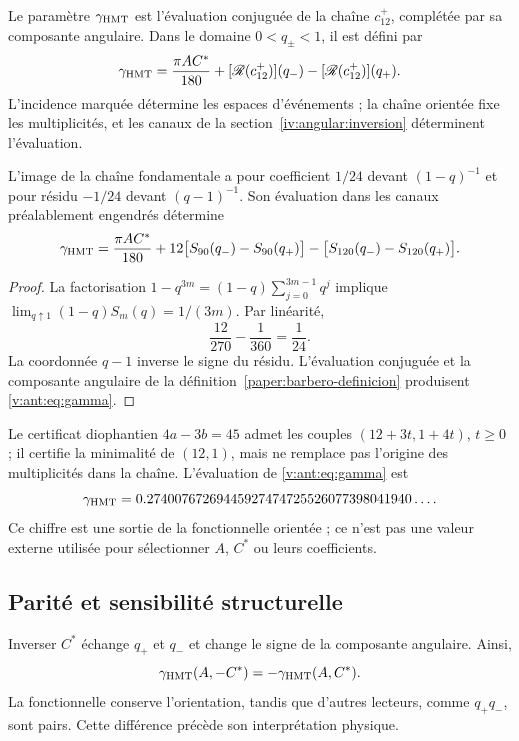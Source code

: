 \begin{definition}
\label{paper:barbero-definicion}
Le paramètre \(\gamma_{\mathrm{HMT}}\) est l’évaluation conjuguée de la chaîne
\(c_{12}^{+}\), complétée par sa composante angulaire. Dans le domaine
\(0<q_\pm<1\), il est défini par
\[
\gamma_{\mathrm{HMT}}=\frac{\pi AC^*}{180}
+[\mathscr R(c_{12}^{+})](q_-)-[\mathscr R(c_{12}^{+})](q_+).
\]
L'incidence marquée détermine les espaces d'événements ; la chaîne orientée fixe les multiplicités, et les canaux de la section~\ref{iv:angular:inversion} déterminent l'évaluation.
\end{definition}

\begin{theorem}
L'image de la chaîne fondamentale a pour coefficient $1/24$
devant $(1-q)^{-1}$ et pour résidu $-1/24$ devant $(q-1)^{-1}$.
Son évaluation dans les canaux préalablement engendrés détermine
\begin{equation}
\gamma_{\mathrm{HMT}}=
\frac{\pi AC^*}{180}
+12\bigl[S_{90}(q_-)-S_{90}(q_+)\bigr]
-\bigl[S_{120}(q_-)-S_{120}(q_+)\bigr].
\label{v:ant:eq:gamma}
\end{equation}
\end{theorem}
\begin{proof}
La factorisation $1-q^{3m}=(1-q)\sum_{j=0}^{3m-1}q^j$ implique
$\lim_{q\uparrow1}(1-q)S_m(q)=1/(3m)$. Par linéarité,
\[
\frac{12}{270}-\frac1{360}=\frac1{24}.
\]
La coordonnée $q-1$ inverse le signe du résidu.
L’évaluation conjuguée et la composante angulaire de la définition~\ref{paper:barbero-definicion}
produisent \eqref{v:ant:eq:gamma}.
\end{proof}

Le certificat diophantien $4a-3b=45$ admet les couples
$(12+3t,1+4t)$, $t\ge0$ ; il certifie la minimalité de $(12,1)$,
mais ne remplace pas l'origine des multiplicités dans la chaîne.
L'évaluation de \eqref{v:ant:eq:gamma} est
\[
\gamma_{\mathrm{HMT}}
=0.27400767269445927474725526077398041940\ldots.
\]
Ce chiffre est une sortie de la fonctionnelle orientée ; ce n’est pas une valeur externe
utilisée pour sélectionner $A$, $C^*$ ou leurs coefficients.

\subsection{Parité et sensibilité structurelle}
Inverser $C^*$ échange $q_+$ et $q_-$ et change le signe
de la composante angulaire. Ainsi,
\[
\gamma_{\mathrm{HMT}}(A,-C^*)=-\gamma_{\mathrm{HMT}}(A,C^*).
\]
La fonctionnelle conserve l'orientation, tandis que d'autres lecteurs,
comme $q_+q_-$, sont pairs. Cette différence précède son interprétation physique.
